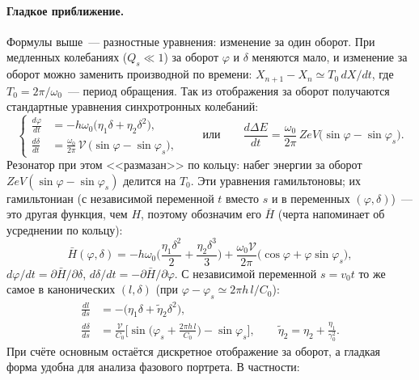 \documentclass[a4paper,11pt]{article}
\numberwithin{equation}{section}
\begin{document}
\paragraph{Гладкое приближение.} Формулы выше~--- разностные уравнения: изменение за один оборот. При медленных
колебаниях ($Q_s\ll1$) за оборот $\varphi$ и $\delta$ меняются мало, и изменение за оборот можно заменить
производной по времени: $X_{n+1}-X_n\simeq T_0\,dX/dt$, где $T_0=2\pi/\omega_0$~--- период обращения. Так из
отображения за оборот получаются стандартные уравнения синхротронных колебаний:
\begin{equation}
\left\{\begin{aligned}
\frac{d\varphi}{dt}&=-h\omega_0\big(\eta_1\delta+\eta_2\delta^2\big),\\[2pt]
\frac{d\delta}{dt}&=\frac{\omega_0}{2\pi}\,\mathcal V\,\big(\sin\varphi-\sin\varphi_s\big),
\end{aligned}\right.\qquad\text{или}\qquad
\frac{d\Delta E}{dt}=\frac{\omega_0}{2\pi}\,ZeV\big(\sin\varphi-\sin\varphi_s\big). \label{eq:smooth}
\end{equation}
Резонатор при этом <<размазан>> по кольцу: набег энергии за оборот $ZeV(\sin\varphi-\sin\varphi_s)$ делится на $T_0$.
Эти уравнения гамильтоновы; их гамильтониан (с независимой переменной $t$ вместо $s$ и в переменных $(\varphi,\delta)$)~---
это другая функция, чем $H$, поэтому обозначим его $\bar H$ (черта напоминает об усреднении по кольцу):
\begin{equation}
\bar H(\varphi,\delta)=-h\omega_0\Big(\frac{\eta_1\delta^2}{2}+\frac{\eta_2\delta^3}{3}\Big)
+\frac{\omega_0\mathcal V}{2\pi}\big(\cos\varphi+\varphi\sin\varphi_s\big), \label{eq:K}
\end{equation}
$d\varphi/dt=\partial\bar H/\partial\delta$, $d\delta/dt=-\partial\bar H/\partial\varphi$. С независимой переменной $s=v_0t$ то же
самое в канонических $(l,\delta)$ (при $\varphi-\varphi_s\simeq2\pi h\,l/C_0$):
\begin{equation}
\begin{aligned}
\frac{dl}{ds}&=-\big(\eta_1\delta+\tilde\eta_2\delta^2\big),\\
\frac{d\delta}{ds}&=\frac{\mathcal V}{C_0}\Big[\sin\Big(\varphi_s+\frac{2\pi h\,l}{C_0}\Big)-\sin\varphi_s\Big],\qquad
\tilde\eta_2=\eta_2+\frac{\eta_1}{\gamma_0^2}.
\end{aligned}
\end{equation}
При счёте основным остаётся дискретное отображение за оборот, а гладкая форма удобна для анализа фазового портрета.
В частности:
\end{document}
